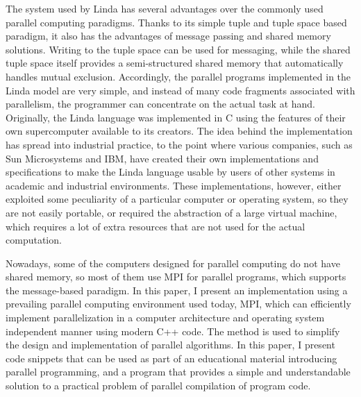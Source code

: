 The system used by Linda has several advantages over the commonly used parallel computing paradigms. Thanks to its simple tuple and tuple space based paradigm, it also has the advantages of message passing and shared memory solutions. Writing to the tuple space can be used for messaging, while the shared tuple space itself provides a semi-structured shared memory that automatically handles mutual exclusion. Accordingly, the parallel programs implemented in the Linda model are very simple, and instead of many code fragments associated with parallelism, the programmer can concentrate on the actual task at hand. Originally, the Linda language was implemented in C using the features of their own supercomputer available to its creators. The idea behind the implementation has spread into industrial practice, to the point where various companies, such as Sun Microsystems and IBM, have created their own implementations and specifications to make the Linda language usable by users of other systems in academic and industrial environments. These implementations, however, either exploited some peculiarity of a particular computer or operating system, so they are not easily portable, or required the abstraction of a large virtual machine, which requires a lot of extra resources that are not used for the actual computation.

Nowadays, some of the computers designed for parallel computing do not have shared memory, so most of them use MPI for parallel programs, which supports the message-based paradigm. In this paper, I present an implementation using a prevailing parallel computing environment used today, MPI, which can efficiently implement parallelization in a computer architecture and operating system independent manner using modern C++ code. The method is used to simplify the design and implementation of parallel algorithms. In this paper, I present code snippets that can be used as part of an educational material introducing parallel programming, and a program that provides a simple and understandable solution to a practical problem of parallel compilation of program code.

\vfill
\selectthesislanguage

\setcounter{romanPage}{\value{page}}
